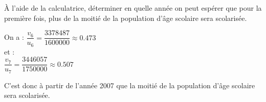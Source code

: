 \begin{questions}
\begin{parts}
			
		\end{parts}
	
	\question[1] \`A l'aide de la calculatrice, déterminer en quelle année on peut espérer que pour la première fois, plus de la moitié de la population d'âge scolaire sera scolarisée.
	
	\begin{solution}
		On a :
		$\dfrac{v_6}{u_6} = \dfrac{\num{3378487}}{1600000} \approx \num{0.473}$\\
		
		et :\\
		$\dfrac{v_7}{u_7} = \dfrac{\num{3446057}}{1750000} \approx \num{0.507}$
		
		C'est donc à partir de l'année 2007 que la moitié de la population d'âge scolaire sera scolarisée.
	\end{solution}
\end{questions}


